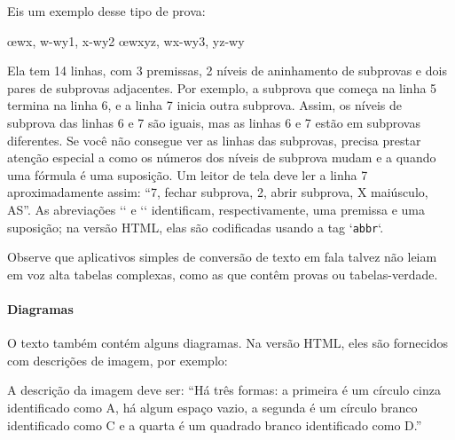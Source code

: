 Eis um exemplo desse tipo de prova:
\begin{fitchproof}
\PR
{}\PR
{}\PR
\open
	\AS
	\open
		\AS
	\close
	\open
		\AS
	\close
	\oe{wx, w-wy1, x-wy2}
\close
\open
	\AS
\close
{}\oe{wxyz, wx-wy3, yz-wy}
\end{fitchproof}
Ela tem 14 linhas, com 3 premissas, 2 níveis de aninhamento de subprovas e dois pares de subprovas adjacentes. Por exemplo, a subprova que começa na linha 5 termina na linha 6, e a linha 7 inicia outra subprova. Assim, os níveis de subprova das linhas 6 e 7 são iguais, mas as linhas 6 e 7 estão em subprovas diferentes. Se você não consegue ver as linhas das subprovas, precisa prestar atenção especial a como os números dos níveis de subprova mudam e a quando uma fórmula é uma suposição. Um leitor de tela deve ler a linha 7 aproximadamente assim: \textquotedblleft 7, fechar subprova, 2, abrir subprova, X maiúsculo, AS\textquotedblright{}. As abreviações `\PR` e `\AS` identificam, respectivamente, uma premissa e uma suposição; na versão HTML, elas são codificadas usando a tag `\verb|abbr|`.

Observe que aplicativos simples de conversão de texto em fala talvez não leiam em voz alta tabelas complexas, como as que contêm provas ou tabelas-verdade.

\paragraph{Diagramas}

O texto também contém alguns diagramas. Na versão HTML, eles são fornecidos com descrições de imagem, por exemplo:
\begin{center}
\end{center}
A descrição da imagem deve ser: \textquotedblleft Há três formas: a primeira é um círculo cinza identificado como A, há algum espaço vazio, a segunda é um círculo branco identificado como C e a quarta é um quadrado branco identificado como D.\textquotedblright{}

